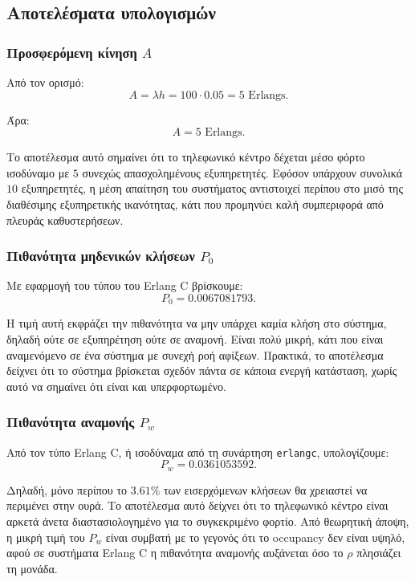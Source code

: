 \documentclass{article}
\begin{document}
\subsection{Αποτελέσματα υπολογισμών}

\subsubsection{Προσφερόμενη κίνηση $A$}

Από τον ορισμό:
\[
A = \lambda h = 100 \cdot 0.05 = 5 \text{ Erlangs}.
\]

Άρα:
\[
\boxed{A = 5 \text{ Erlangs}}.
\]

Το αποτέλεσμα αυτό σημαίνει ότι το τηλεφωνικό κέντρο δέχεται μέσο φόρτο ισοδύναμο με $5$ συνεχώς απασχολημένους εξυπηρετητές. Εφόσον υπάρχουν συνολικά $10$ εξυπηρετητές, η μέση απαίτηση του συστήματος αντιστοιχεί περίπου στο μισό της διαθέσιμης εξυπηρετικής ικανότητας, κάτι που προμηνύει καλή συμπεριφορά από πλευράς καθυστερήσεων.

\subsubsection{Πιθανότητα μηδενικών κλήσεων $P_0$}

Με εφαρμογή του τύπου του Erlang C βρίσκουμε:
\[
\boxed{P_0 = 0.0067081793}.
\]

Η τιμή αυτή εκφράζει την πιθανότητα να μην υπάρχει καμία κλήση στο σύστημα, δηλαδή ούτε σε εξυπηρέτηση ούτε σε αναμονή. Είναι πολύ μικρή, κάτι που είναι αναμενόμενο σε ένα σύστημα με συνεχή ροή αφίξεων. Πρακτικά, το αποτέλεσμα δείχνει ότι το σύστημα βρίσκεται σχεδόν πάντα σε κάποια ενεργή κατάσταση, χωρίς αυτό να σημαίνει ότι είναι και υπερφορτωμένο.

\subsubsection{Πιθανότητα αναμονής $P_w$}

Από τον τύπο Erlang C, ή ισοδύναμα από τη συνάρτηση \texttt{erlangc}, υπολογίζουμε:
\[
\boxed{P_w = 0.0361053592}.
\]

Δηλαδή, μόνο περίπου το $3.61\%$ των εισερχόμενων κλήσεων θα χρειαστεί να περιμένει στην ουρά. Το αποτέλεσμα αυτό δείχνει ότι το τηλεφωνικό κέντρο είναι αρκετά άνετα διαστασιολογημένο για το συγκεκριμένο φορτίο. Από θεωρητική άποψη, η μικρή τιμή του $P_w$ είναι συμβατή με το γεγονός ότι το occupancy δεν είναι υψηλό, αφού σε συστήματα Erlang C η πιθανότητα αναμονής αυξάνεται όσο το $\rho$ πλησιάζει τη μονάδα.
\end{document}
